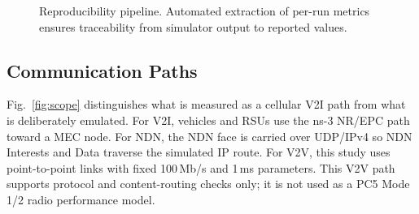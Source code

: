\documentclass[journal]{IEEEtran}
\begin{document}
\begin{figure}[!t]\centering
{}
\caption{Reproducibility pipeline. Automated extraction of per-run metrics ensures traceability from simulator output to reported values.}
\label{fig:pipeline}
\end{figure}

\subsection{Communication Paths}

Fig.~\ref{fig:scope} distinguishes what is measured as a cellular V2I path from what is deliberately emulated. For V2I, vehicles and RSUs use the ns-3 NR/EPC path toward a MEC node. For NDN, the NDN face is carried over UDP/IPv4 so NDN Interests and Data traverse the simulated IP route. For V2V, this study uses point-to-point links with fixed 100\,Mb/s and 1\,ms parameters. This V2V path supports protocol and content-routing checks only; it is not used as a PC5 Mode 1/2 radio performance model.
\end{document}
